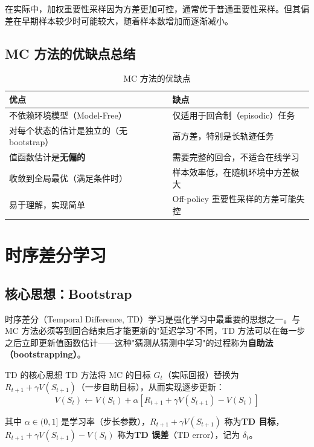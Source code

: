 \begin{remark}
在实际中，加权重要性采样因为方差更加可控，通常优于普通重要性采样。但其偏差在早期样本较少时可能较大，随着样本数增加而逐渐减小。
\end{remark}

\subsection{MC 方法的优缺点总结}

\begin{table}[H]
\centering
\caption{MC 方法的优缺点}
\begin{tabular}{@{}p{4cm}p{6cm}@{}}
\toprule
优点 & 缺点 \\
\midrule
不依赖环境模型（Model-Free） & 仅适用于回合制（episodic）任务 \\
对每个状态的估计是独立的（无 bootstrap） & 高方差，特别是长轨迹任务 \\
值函数估计是\textbf{无偏的} & 需要完整的回合，不适合在线学习 \\
收敛到全局最优（满足条件时） & 样本效率低，在随机环境中方差极大 \\
易于理解，实现简单 & Off-policy 重要性采样的方差可能失控 \\
\bottomrule
\end{tabular}
\end{table}

\section{时序差分学习}

\subsection{核心思想：Bootstrap}

时序差分（Temporal Difference, TD）学习是强化学习中最重要的思想之一。与 MC 方法必须等到回合结束后才能更新的"延迟学习"不同，TD 方法可以在每一步之后立即更新值函数估计——这种"猜测从猜测中学习"的过程称为\textbf{自助法（bootstrapping）}。

\begin{mydefinition}{TD 的核心思想}
TD 方法将 MC 的目标 $G_t$（实际回报）替换为 $R_{t+1} + \gamma V(S_{t+1})$（一步自助目标），从而实现逐步更新：
$$V(S_t) \leftarrow V(S_t) + \alpha [R_{t+1} + \gamma V(S_{t+1}) - V(S_t)]$$

其中 $\alpha \in (0,1]$ 是学习率（步长参数），$R_{t+1} + \gamma V(S_{t+1})$ 称为\textbf{TD 目标}，$R_{t+1} + \gamma V(S_{t+1}) - V(S_t)$ 称为\textbf{TD 误差}（TD error），记为 $\delta_t$。
\end{mydefinition}

